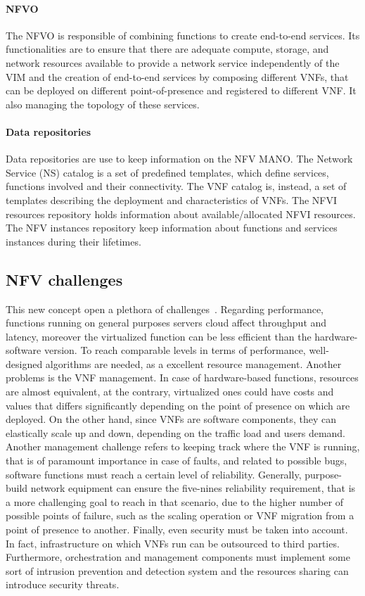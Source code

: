\paragraph*{NFVO}
The NFVO is responsible of combining functions to create end-to-end services.
Its functionalities are to ensure that there are adequate compute, storage, and
network resources available to provide a network service independently of the
VIM and the creation of end-to-end services by composing different VNFs, that
can be deployed on different point-of-presence and registered to different VNF.
It also managing the topology of these services. 

\paragraph*{Data repositories} Data repositories are use to keep information on
the NFV MANO. The Network Service (NS) catalog is a set of predefined templates,
which define services, functions involved and their connectivity. The VNF
catalog is, instead, a set of templates describing the deployment and
characteristics of VNFs. The NFVI resources repository holds information about
available/allocated NFVI resources. The NFV instances repository keep
information about functions and services instances during their lifetimes.

\subsection{NFV challenges}
This new concept open a plethora of challenges~\cite{han2015network}. Regarding
performance, functions running on general purposes servers cloud affect
throughput and latency, moreover the virtualized function can be less efficient
than the hardware-software version. To reach comparable levels in terms of
performance, well-designed algorithms are needed, as a excellent resource
management. Another problems is the VNF management. In case of hardware-based
functions, resources are almost equivalent, at the contrary, virtualized ones
could have costs and values that differs significantly depending on the point of
presence on which are deployed. On the other hand, since VNFs are software
components, they can elastically scale up and down, depending on the traffic
load and users demand. Another management challenge refers to keeping track
where the VNF is running, that is of paramount importance in case of faults, and
related to possible bugs, software functions must reach a certain level
of reliability. Generally, purpose-build network equipment can ensure the
five-nines reliability requirement, that is a more challenging goal to reach
in that scenario, due to the higher number of possible points of failure, such
as the scaling operation or VNF migration from a point of presence to another.
Finally, even security must be taken into account. In fact, infrastructure on
which VNFs run can be outsourced to third parties. Furthermore, orchestration
and management components must implement some sort of intrusion prevention and
detection system and the resources sharing can introduce security threats.

